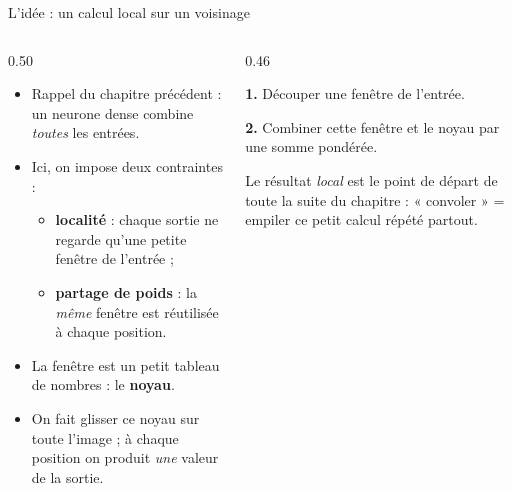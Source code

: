 \begin{frame}{L'idée : un calcul local sur un voisinage}
\begin{columns}[t]
\begin{column}{0.50\textwidth}
\begin{itemize}
  \item Rappel du chapitre précédent : un neurone dense combine \emph{toutes} les entrées.
  \item Ici, on impose deux contraintes :
  \begin{itemize}
    \item \textbf{localité} : chaque sortie ne regarde qu'une petite fenêtre de l'entrée ;
    \item \textbf{partage de poids} : la \emph{même} fenêtre est réutilisée à chaque position.
  \end{itemize}
  \item La fenêtre est un petit tableau de nombres : le \textbf{noyau}.
  \item On fait glisser ce noyau sur toute l'image ; à chaque position on produit
  \emph{une} valeur de la sortie.
\end{itemize}
\end{column}
\begin{column}{0.46\textwidth}
\begin{abox}
\textbf{1.} Découper une fenêtre de l'entrée.

\textbf{2.} Combiner cette fenêtre et le noyau par une somme pondérée.

\medskip
Le résultat \emph{local} est le point de départ de toute la suite du chapitre :
« convoler » = empiler ce petit calcul répété partout.
\end{abox}
\end{column}
\end{columns}
\end{frame}

